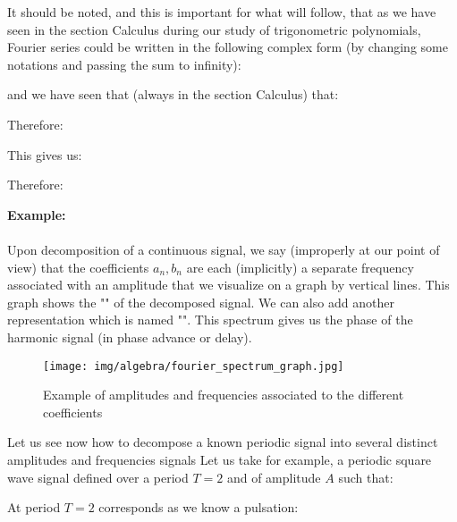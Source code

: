 	It should be noted, and this is important for what will follow, that as we have seen in the section Calculus during our study of trigonometric polynomials, Fourier series could be written in the following complex form (by changing some notations and passing the sum to infinity):
	
	and we have seen that (always in the section Calculus) that:
	
	Therefore:
	
	This gives us:
	
	Therefore:
	
	\begin{tcolorbox}[colframe=black,colback=white,sharp corners]
	\textbf{{\Large {}}Example:}\\\\
	Upon decomposition of a continuous signal, we say (improperly at our point of view) that the coefficients $a_n,b_n$ are each (implicitly) a separate frequency associated with an amplitude that we visualize on a graph by vertical lines. This graph shows the "" of the decomposed signal. We can also add another representation which is named "". This spectrum gives us the phase of the harmonic signal (in phase advance or delay).
	\begin{figure}[H]
		\centering
		\texttt{[image: img/algebra/fourier\_spectrum\_graph.jpg]}
		\caption{Example of amplitudes and frequencies associated to the different coefficients}
	\end{figure}
	Let us see now how to decompose a known periodic signal into several distinct amplitudes and frequencies signals
	Let us take for example, a periodic square wave signal defined over a period $T = 2$ and of amplitude $A$ such that:
	
	At period $T = 2$ corresponds as we know a pulsation:
	
	\end{tcolorbox}
	
